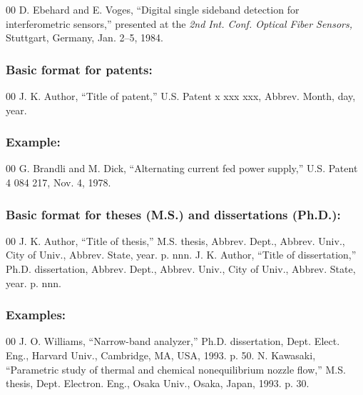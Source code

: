 \documentclass{ieeeojpel}
\begin{document}
\begin{thebibliography}{00}
 D. Ebehard and E. Voges, ``Digital single sideband
detection for interferometric sensors,'' presented at the \textit{2nd Int. Conf. Optical Fiber Sensors,} Stuttgart, Germany, Jan. 2--5, 1984.
\end{thebibliography}

\subsubsection*{Basic format for patents:}

\begin{thebibliography}{00}
 J. K. Author, ``Title of patent,'' U.S. Patent {x xxx xxx}, Abbrev. Month, day, year.
\end{thebibliography}

\subsubsection*{Example:}

\begin{thebibliography}{00}
 G. Brandli and M. Dick, ``Alternating current fed power supply,'' U.S. Patent 4 084 217, Nov. 4, 1978.
\end{thebibliography}

\subsubsection*{Basic format for theses (M.S.) and dissertations (Ph.D.):}

\begin{thebibliography}{00}
 J. K. Author, ``Title of thesis,'' M.S. thesis, Abbrev. Dept., Abbrev.
Univ., City of Univ., Abbrev. State, year. p. nnn.
 J. K. Author, ``Title of dissertation,'' Ph.D. dissertation, Abbrev.
Dept., Abbrev. Univ., City of Univ., Abbrev. State, year. p. nnn.
\end{thebibliography}

\subsubsection*{Examples:}

\begin{thebibliography}{00}
 J. O. Williams, ``Narrow-band analyzer,'' Ph.D. dissertation, Dept. Elect. Eng., Harvard Univ., Cambridge, MA, USA, 1993. p. 50.
 N. Kawasaki, ``Parametric study of thermal and chemical nonequilibrium nozzle flow,'' M.S. thesis, Dept. Electron. Eng., Osaka Univ., Osaka, Japan, 1993. p. 30.
\end{thebibliography}
\end{document}
